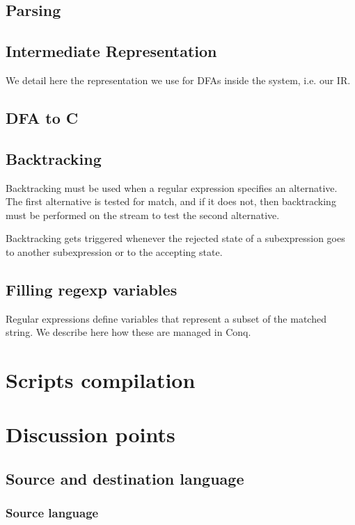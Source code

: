 \documentclass[11pt,a4paper]{report}
\begin{document}
\section{Parsing}

\section{Intermediate Representation}

We detail here the representation we use for DFAs inside the system, i.e. our IR.

\section{DFA to C}

\section{Backtracking}

Backtracking must be used when a regular expression specifies an alternative. The first alternative is tested for match, and if it does not, then backtracking must be performed on the stream to test the second alternative.

Backtracking gets triggered whenever the rejected state of a subexpression goes to another subexpression or to the accepting state.

\section{Filling regexp variables}

Regular expressions define variables that represent a subset of the matched string. We describe here how these are managed in Conq.

\chapter{Scripts compilation}

\chapter{Discussion points}

\section{Source and destination language}

\subsection{Source language}
\end{document}

